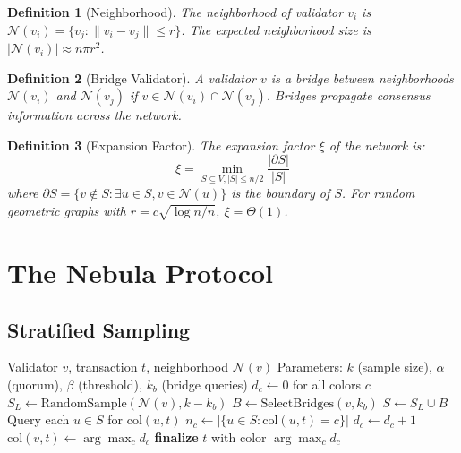 \documentclass[11pt,a4paper]{article}
\newtheorem{definition}{Definition}[section]
\begin{document}
\begin{definition}[Neighborhood]
The neighborhood of validator $v_i$ is $\mathcal{N}(v_i) = \{v_j : \|v_i - v_j\| \leq r\}$.
The expected neighborhood size is $|\mathcal{N}(v_i)| \approx n \pi r^2$.
\end{definition}

\begin{definition}[Bridge Validator]
A validator $v$ is a bridge between neighborhoods $\mathcal{N}(v_i)$ and $\mathcal{N}(v_j)$
if $v \in \mathcal{N}(v_i) \cap \mathcal{N}(v_j)$. Bridges propagate consensus information
across the network.
\end{definition}

\begin{definition}[Expansion Factor]
The expansion factor $\xi$ of the network is:
\[
\xi = \min_{S \subseteq V, |S| \leq n/2} \frac{|\partial S|}{|S|}
\]
where $\partial S = \{v \notin S : \exists u \in S, v \in \mathcal{N}(u)\}$ is the
boundary of $S$. For random geometric graphs with $r = c\sqrt{\log n / n}$, $\xi = \Theta(1)$.
\end{definition}

\section{The Nebula Protocol}
\label{sec:protocol}

\subsection{Stratified Sampling}

\begin{algorithm}[H]
\caption{Nebula Protocol --- Stratified Neighborhood Sampling}
\label{alg:nebula-core}
\begin{algorithmic}[1]
\Require Validator $v$, transaction $t$, neighborhood $\mathcal{N}(v)$
\Require Parameters: $k$ (sample size), $\alpha$ (quorum), $\beta$ (threshold), $k_b$ (bridge queries)
\State $d_c \gets 0$ for all colors $c$
    \State {}
    \State $S_L \gets \text{RandomSample}(\mathcal{N}(v), k - k_b)$
    \State {}
    \State $B \gets \text{SelectBridges}(v, k_b)$ 
    \State $S \gets S_L \cup B$ 
    \State Query each $u \in S$ for $\text{col}(u, t)$
        \State $n_c \gets |\{u \in S : \text{col}(u, t) = c\}|$
            \State $d_c \gets d_c + 1$
        \EndIf
    \EndFor
    \State $\text{col}(v, t) \gets \arg\max_c d_c$
        \State \textbf{finalize} $t$ with color $\arg\max_c d_c$
    \EndIf
\EndWhile
\end{algorithmic}
\end{algorithm}
\end{document}
